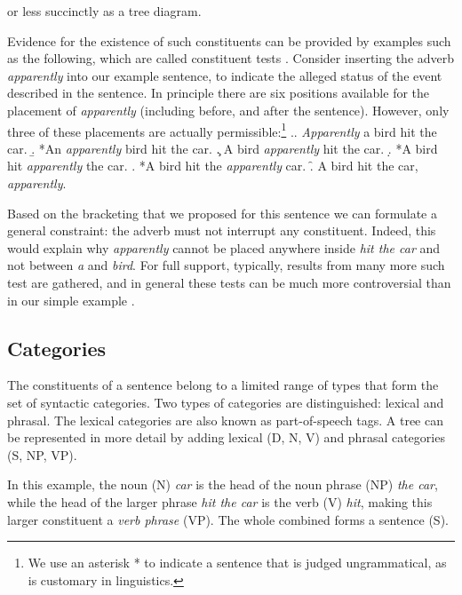 or less succinctly as a tree diagram.
\begin{figure}[h]
  \center
  \label{fig:bird-tree}
\end{figure}
Evidence for the existence of such constituents can be provided by examples such as the following, which are called constituent tests \citep{carnie2010constituent}. Consider inserting the adverb \textit{apparently} into our example sentence, to indicate the alleged status of the event described in the sentence. In principle there are six positions available for the placement of \textit{apparently} (including before, and after the sentence). However, only three of these placements are actually permissible:\footnote{We use an asterisk * to indicate a sentence that is judged ungrammatical, as is customary in linguistics.}
\exi.\a. \textit{Apparently} a bird hit the car.
  \b. *An \textit{apparently} bird hit the car.
  \c. A bird \textit{apparently} hit the car.
  \d. *A bird hit \textit{apparently} the car.
  \e. *A bird hit the \textit{apparently} car.
  \f. A bird hit the car, \textit{apparently}.

Based on the bracketing that we proposed for this sentence we can formulate a general constraint: the adverb must not interrupt any constituent. Indeed, this would explain why \textit{apparently} cannot be placed anywhere inside \textit{hit the car} and not between \textit{a} and \textit{bird}. For full support, typically, results from many more such test are gathered, and in general these tests can be much more controversial than in our simple example \citep{carnie2010constituent}.

\subsection{Categories}
The constituents of a sentence belong to a limited range of types that form the set of syntactic categories. Two types of categories are distinguished: lexical and phrasal. The lexical categories are also known as part-of-speech tags. A tree can be represented in more detail by adding lexical (D, N, V) and phrasal categories (S, NP, VP).
\begin{figure}[h]
  \center
\end{figure}
In this example, the noun (N) \textit{car} is the head of the noun phrase (NP) \textit{the car}, while the head of the larger phrase \textit{hit the car} is the verb (V) \textit{hit}, making this larger constituent a \textit{verb phrase} (VP). The whole combined forms a sentence (S).

